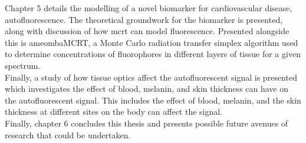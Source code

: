 Chapter 5 details the modelling of a novel biomarker for cardiovascular disease, autofluorescence.
The theoretical groundwork for the biomarker is presented, along with discussion of how \gls*{mcrt} can model fluorescence.
Presented alongside this is ameombaMCRT, a Monte Carlo radiation transfer simplex algorithm used to determine concentrations of fluorophores in different layers of tissue for a given spectrum.\\
Finally, a study of how tissue optics affect the autofluorescent signal is presented which investigates the effect of blood, melanin, and skin thickness can have on the autofluorescent signal.
This includes the effect of blood, melanin, and the skin thickness at different sites  on the body can affect the signal.\\


Finally, chapter 6 concludes this thesis and presents possible future avenues of research that could be undertaken.